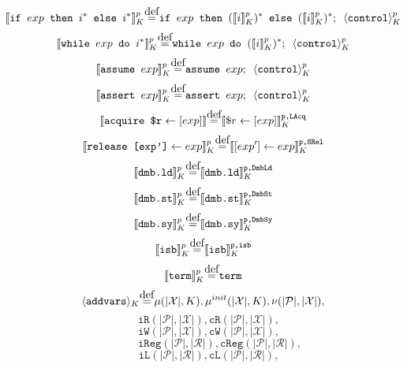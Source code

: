 \documentclass{article}
\newcommand{\var}{\texttt}
\newcommand\myeq{\stackrel{\mathclap{\normalfont\mbox{def}}}{=}}
\begin{document}
\vspace{-1.2em}
$$\llbracket \texttt{if } exp \texttt{ then }i^* \texttt{ else }i^* \rrbracket_K^p \myeq \texttt{if } exp \texttt{ then } (\llbracket i  \rrbracket_K^p)^* \texttt{ else } (\llbracket i \rrbracket_K^p)^*; \kern 0.5em \langle \texttt{control} \rangle_K^p$$
\vspace{-1.2em}
$$\llbracket \texttt{while } exp \texttt{ do }i^* \rrbracket_K^p \myeq \texttt{while } exp \texttt{ do } (\llbracket i \rrbracket_K^p)^*; \kern 0.5em \langle \texttt{control} \rangle_K^p$$
\vspace{-1.2em}
$$\llbracket \texttt{assume } exp \rrbracket_K^p \myeq \texttt{assume } exp ; \kern 0.5em \langle \texttt{control} \rangle_K^p$$
\vspace{-1.2em}
$$\llbracket \texttt{assert } exp \rrbracket_K^p \myeq \texttt{assert } exp ; \kern 0.5em \langle \texttt{control} \rangle_K^p$$
\vspace{-1.2em}
$$\llbracket \texttt{acquire \$r} \leftarrow [exp] \rrbracket \myeq \llbracket \$r \leftarrow [exp] \rrbracket_K^\texttt{p,LAcq}$$
\vspace{-1.2em}
$$\llbracket \texttt{release [exp']} \leftarrow exp \rrbracket_K^p \myeq \llbracket [exp'] \leftarrow exp \rrbracket_K^\texttt{p,SRel}$$
\vspace{-1.2em}
$$\llbracket \texttt{dmb.ld} \rrbracket_K^p \myeq \llbracket \texttt{dmb.ld} \rrbracket_K^\texttt{p,DmbLd}$$
\vspace{-1.2em}
$$\llbracket \texttt{dmb.st} \rrbracket_K^p \myeq \llbracket \texttt{dmb.st} \rrbracket_K^\texttt{p,DmbSt}$$
\vspace{-1.2em}
$$\llbracket \texttt{dmb.sy} \rrbracket_K^p \myeq \llbracket \texttt{dmb.sy} \rrbracket_K^\texttt{p,DmbSy}$$
\vspace{-1.2em}
$$\llbracket \texttt{isb} \rrbracket_K^p \myeq \llbracket \texttt{isb} \rrbracket_K^\texttt{p,isb}$$
\vspace{-1.2em}
$$\llbracket\texttt{term}\rrbracket_K^p \myeq \texttt{term}$$
\vspace{-1.2em}
$$\langle \var{addvars} \rangle_K \myeq \mu(|\mathcal{X}|,K), \mu^{init}(|\mathcal{X}|,K), \nu(|\mathcal{P}|,|\mathcal{X}|),$$
$$ \quad\var{iR}(|\mathcal{P}|,|\mathcal{X}|), \var{cR}(|\mathcal{P}|,|\mathcal{X}|),$$
$$ \quad\var{iW}(|\mathcal{P}|,|\mathcal{X}|), \var{cW}(|\mathcal{P}|,|\mathcal{X}|),$$
$$ \qquad\quad\var{iReg}(|\mathcal{P}|,|\mathcal{R}|), \var{cReg}(|\mathcal{P}|,|\mathcal{R}|),$$
$$ \quad\var{iL}(|\mathcal{P}|,|\mathcal{R}|), \var{cL}(|\mathcal{P}|,|\mathcal{R}|),$$
\end{document}
